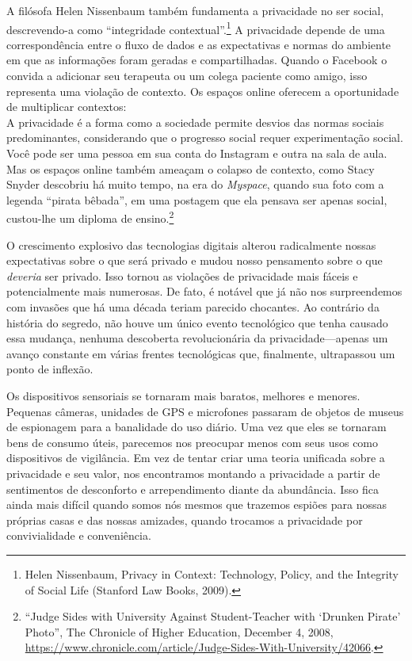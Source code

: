 \documentclass{book}
\newcommand{\ingles}[1]{\textit{#1}}
\begin{document}
A filósofa Helen Nissenbaum também fundamenta a privacidade no ser social,
descrevendo-a como ``integridade contextual''.\footnote{Helen Nissenbaum,
Privacy in Context: Technology, Policy, and the Integrity of Social Life
(Stanford Law Books, 2009).} A privacidade depende de uma correspondência entre
o fluxo de dados e as expectativas e normas do ambiente em que as informações
foram geradas e compartilhadas. Quando o Facebook o convida a adicionar seu
terapeuta ou um colega paciente como amigo, isso representa uma violação de
contexto. Os espaços online oferecem a oportunidade de multiplicar contextos:\\

A privacidade é a forma como a sociedade permite desvios das normas sociais
predominantes, considerando que o progresso social requer experimentação
social.\\

Você pode ser uma pessoa em sua conta do Instagram e outra na sala de aula. Mas
os espaços online também ameaçam o colapso de contexto, como Stacy Snyder
descobriu há muito tempo, na era do \ingles{Myspace}, quando sua foto com a
legenda ``pirata bêbada'', em uma postagem que ela pensava ser apenas social,
custou-lhe um diploma de ensino.\footnote{``Judge Sides with University Against
Student-Teacher with `Drunken Pirate' Photo'', The Chronicle of Higher
Education, December 4, 2008,
\url{https://www.chronicle.com/article/Judge-Sides-With-University/42066}.}

O crescimento explosivo das tecnologias digitais alterou radicalmente nossas
expectativas sobre o que será privado e mudou nosso pensamento sobre o que
\emph{deveria} ser privado. Isso tornou as violações de privacidade mais fáceis
e potencialmente mais numerosas. De fato, é notável que já não nos
surpreendemos com invasões que há uma década teriam parecido chocantes. Ao
contrário da história do segredo, não houve um único evento tecnológico que
tenha causado essa mudança, nenhuma descoberta revolucionária da
privacidade---apenas um avanço constante em várias frentes tecnológicas que,
finalmente, ultrapassou um ponto de inflexão.

Os dispositivos sensoriais se tornaram mais baratos, melhores e menores.
Pequenas câmeras, unidades de GPS e microfones passaram de objetos de museus de
espionagem para a banalidade do uso diário. Uma vez que eles se tornaram bens
de consumo úteis, parecemos nos preocupar menos com seus usos como dispositivos
de vigilância. Em vez de tentar criar uma teoria unificada sobre a privacidade
e seu valor, nos encontramos montando a privacidade a partir de sentimentos de
desconforto e arrependimento diante da abundância. Isso fica ainda mais difícil
quando somos nós mesmos que trazemos espiões para nossas próprias casas e das
nossas amizades, quando trocamos a privacidade por convivialidade e
conveniência.
\end{document}
